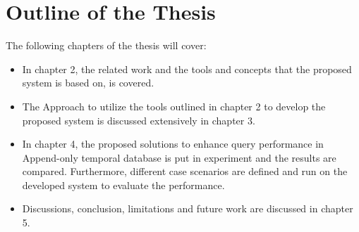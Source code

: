\section{Outline of the Thesis}
The following chapters of the thesis will cover:
\begin{itemize}
	\item In chapter 2, the related work and the tools and concepts that the proposed system is based on, is covered.
	\item The Approach to utilize the tools outlined in chapter 2 to develop the proposed system is discussed extensively in chapter 3.
	\item In chapter 4, the proposed solutions to enhance query performance in Append-only temporal database is put in experiment and the results are compared. Furthermore, different case scenarios are defined and run on the developed system to evaluate the performance.
	\item Discussions, conclusion, limitations and future work are discussed in chapter 5.
\end{itemize}












